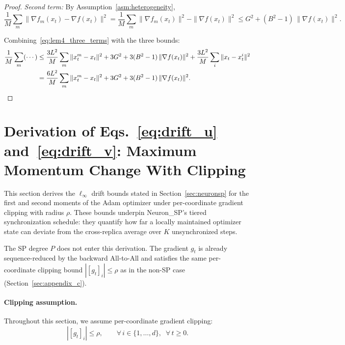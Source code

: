 \documentclass{article}
\begin{document}
\begin{proof}
\noindent\emph{Second term:} By Assumption~\ref{asm:heterogeneity},
\begin{equation}
\frac{1}{M}\sum_m\|\nabla f_m(x_t) - \nabla f(x_t)\|^2
= \frac{1}{M}\sum_m\|\nabla f_m(x_t)\|^2 - \|\nabla f(x_t)\|^2
\leq G^2 + (B^2 - 1)\,\|\nabla f(x_t)\|^2.
\label{eq:lem4_second}
\end{equation}

Combining~\eqref{eq:lem4_three_terms} with the three bounds:
\begin{align}
\frac{1}{M}\sum_m(\cdots)
&\leq \frac{3L^2}{M}\sum_m\|x_t^m - x_t\|^2
+ 3G^2 + 3(B^2-1)\,\|\nabla f(x_t)\|^2
+ \frac{3L^2}{M}\sum_i\|x_t - x_t^i\|^2 \notag \\
&= \frac{6L^2}{M}\sum_m\|x_t^m - x_t\|^2
+ 3G^2 + 3(B^2-1)\,\|\nabla f(x_t)\|^2.
\label{eq:lem4_final}
\end{align}
\end{proof}




\section{Derivation of Eqs.~\eqref{eq:drift_u} and~\eqref{eq:drift_v}: Maximum Momentum Change With Clipping}
\label{sec:drift_derivation}

This section derives the $\ell_\infty$ drift bounds stated in
Section~\ref{sec:neuronsp} for the first and second moments of the Adam
optimizer under per-coordinate gradient clipping with radius $\rho$.
These bounds underpin Neuron\_SP's tiered synchronization schedule: they
quantify how far a locally maintained optimizer state can deviate from
the cross-replica average over $K$ unsynchronized steps.

The SP degree $P$ does not enter this derivation. The gradient
$g_t$ is already sequence-reduced by the backward All-to-All and
satisfies the same per-coordinate clipping bound $|[g_t]_i| \leq \rho$
as in the non-SP case (Section~\ref{sec:appendix_c}).

\paragraph{Clipping assumption.}
Throughout this section, we assume per-coordinate gradient clipping:
\begin{equation}
|[g_t]_i| \leq \rho, \qquad \forall\, i \in \{1,\ldots,d\},\;\; \forall\, t \geq 0.
\label{eq:clip_assumption}
\end{equation}
\end{document}
